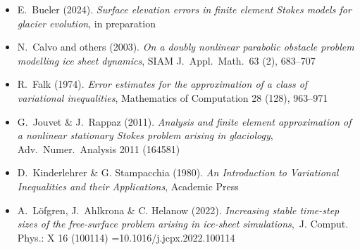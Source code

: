 
\begin{itemize}
\item E.~Bueler (2024). \emph{Surface elevation errors in finite element {S}tokes models for glacier evolution}, in preparation 
\item N.~Calvo and others (2003). \emph{On a doubly nonlinear parabolic obstacle problem modelling ice sheet dynamics}, SIAM J.~Appl.~Math.~63 (2), 683--707 
\item R.~Falk (1974).  \emph{Error estimates for the approximation of a class of variational inequalities}, Mathematics of Computation 28 (128), 963--971
\item G.~Jouvet \& J.~Rappaz (2011). \emph{Analysis and finite element approximation of a nonlinear stationary {S}tokes problem arising in glaciology}, Adv.~Numer.~Analysis 2011 (164581) 
\item D.~Kinderlehrer \& G. Stampacchia (1980). \emph{An {I}ntroduction to {V}ariational {I}nequalities and their {A}pplications}, Academic Press
\item A.~L{\"o}fgren, J.~Ahlkrona \& C. Helanow (2022). \emph{Increasing stable time-step sizes of the free-surface problem arising in ice-sheet simulations},~J. Comput. Phys.: X 16 (100114) \sdoi={10.1016/j.jcpx.2022.100114}
\end{itemize}
